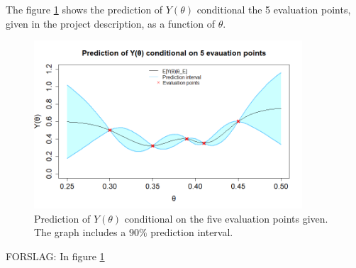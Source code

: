 The figure \ref{2afiveeval} shows the prediction of $Y(\theta)$ conditional the 5 evaluation points, given in the project description, as a function of $\theta$. 

\begin{figure}
    \centering
    \includegraphics[width=100mm]{2aPlot.png}
    \caption{Prediction of $Y(\theta)$ conditional on the five evaluation points given. The graph includes a $90\%$ prediction interval. }
    \label{2afiveeval}
\end{figure}


FORSLAG: In figure \ref{2afiveeval}
